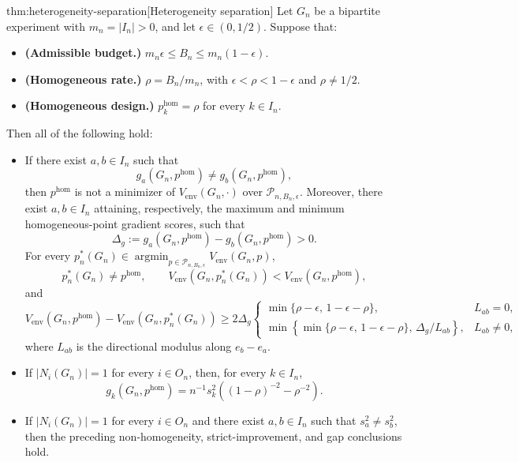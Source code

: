 \begin{theoremv}{thm:heterogeneity-separation}[Heterogeneity separation]
Let \(G_n\) be a bipartite experiment with \(m_n=|I_n|>0\), and let \(\epsilon\in(0,1/2)\). Suppose that:
\begin{itemize}
\item \textbf{(Admissible budget.)} \(m_n\epsilon\le B_n\le m_n(1-\epsilon)\).
\item \textbf{(Homogeneous rate.)} \(\rho=B_n/m_n\), with \(\epsilon<\rho<1-\epsilon\) and \(\rho\neq 1/2\).
\item \textbf{(Homogeneous design.)} \(p^{\mathrm{hom}}_k=\rho\) for every \(k\in I_n\).
\end{itemize}
Then all of the following hold:
\begin{itemize}
\item If there exist \(a,b\in I_n\) such that
\[
g_a(G_n,p^{\mathrm{hom}})\neq g_b(G_n,p^{\mathrm{hom}}),
\]
then \(p^{\mathrm{hom}}\) is not a minimizer of \(V_{\mathrm{env}}(G_n,\cdot)\) over \(\mathcal P_{n,B_n,\epsilon}\). Moreover, there exist \(a,b\in I_n\) attaining, respectively, the maximum and minimum homogeneous-point gradient scores, such that
\[
\Delta_g:=g_a(G_n,p^{\mathrm{hom}})-g_b(G_n,p^{\mathrm{hom}})>0.
\]
For every \(p_n^*(G_n)\in\operatorname{argmin}_{p\in\mathcal P_{n,B_n,\epsilon}}V_{\mathrm{env}}(G_n,p)\),
\[
p_n^*(G_n)\neq p^{\mathrm{hom}},\qquad
V_{\mathrm{env}}(G_n,p_n^*(G_n))<V_{\mathrm{env}}(G_n,p^{\mathrm{hom}}),
\]
and
\[
V_{\mathrm{env}}(G_n,p^{\mathrm{hom}})-V_{\mathrm{env}}(G_n,p_n^*(G_n))
\ge
2\Delta_g
\begin{cases}
\min\{\rho-\epsilon,\,1-\epsilon-\rho\}, & L_{ab}=0,\\
\min\!\left\{\min\{\rho-\epsilon,\,1-\epsilon-\rho\},\,\Delta_g/L_{ab}\right\}, & L_{ab}\neq0,
\end{cases}
\]
where \(L_{ab}\) is the directional modulus along \(e_b-e_a\).

\item If \(|N_i(G_n)|=1\) for every \(i\in O_n\), then, for every \(k\in I_n\),
\[
g_k(G_n,p^{\mathrm{hom}})
=
n^{-1}s_k^2\left((1-\rho)^{-2}-\rho^{-2}\right).
\]

\item If \(|N_i(G_n)|=1\) for every \(i\in O_n\) and there exist \(a,b\in I_n\) such that \(s_a^2\neq s_b^2\), then the preceding non-homogeneity, strict-improvement, and gap conclusions hold.
\end{itemize}
\end{theoremv}

